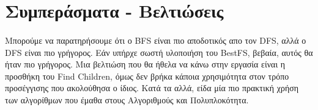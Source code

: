 \documentclass{article}
\begin{document}
    \section{Συμπεράσματα - Βελτιώσεις}
    \paragraph{}
    Μπορούμε να παρατηρήσουμε ότι ο BFS είναι πιο αποδοτικός απο τον DFS, αλλά ο DFS είναι πιο γρήγορος. Εάν υπήρχε σωστή υλοποιήση του BestFS, βεβαία, αυτός θα ήταν πιο γρήγορος.
    Μια βελτιώση που θα ήθελα να κάνω στην εργασία είναι η προσθήκη του Find Children, όμως δεν βρήκα κάποια χρησιμότητα στον τρόπο προσέγγισης που ακολούθησα ο ίδιος. Κατά τα αλλά,
    είδα μία πιο πρακτική χρήση των αλγορίθμων που έμαθα στους Αλγοριθμούς και Πολυπλοκότητα.
\end{document}
